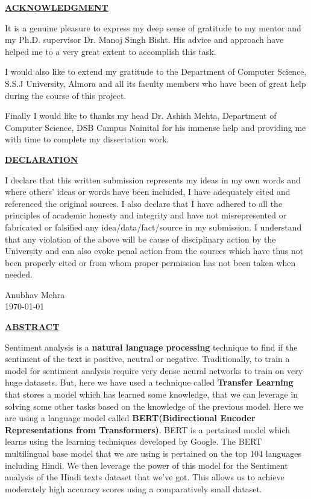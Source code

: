 \documentclass[a4paper, 12pt]{article}
\begin{document}
\begin{sloppypar}
\begin{center}
\textbf{\underline{ACKNOWLEDGMENT}}
\end{center}
It is a genuine pleasure to express my deep sense of gratitude to my mentor and my Ph.D. supervisor Dr. Manoj Singh Bisht. His advice and approach have helped me to a very great extent to accomplish this task. 

I would also like to extend my gratitude to the Department of Computer Science, S.S.J University, Almora and all its faculty members who have been of great help during the course of this project.

Finally I would like to thanks my head Dr. Ashish Mehta, Department of Computer Science, DSB Campus Nainital for his immense help and providing me with time to complete my dissertation work.
\thispagestyle{empty}
\clearpage
\begin{center}
\textbf{\underline{DECLARATION}}
\end{center}
I declare that this written submission represents my ideas in my own words and where others' ideas or words have been included, I have adequately cited and referenced the original sources. I also declare that I have adhered to all the principles of academic honesty and integrity and have not  misrepresented or fabricated or falsified any idea/data/fact/source in my submission. I understand that any violation of the above will be cause of disciplinary action by the University and can also evoke penal action from the sources which have thus not been properly cited or from whom proper permission has not been taken when needed.
\begin{flushright}
Anubhav Mehra \\
\today
\end{flushright}
\thispagestyle{empty}
\clearpage
\begin{center}
\textbf{\underline{ABSTRACT}} \\ [0.5ex]
\end{center}
 Sentiment analysis is a \textbf{natural language processing} technique to find if the sentiment of the text is positive, neutral or negative. Traditionally, to train a model for sentiment analysis require very dense neural networks to train on very huge datasets. But, here we have used a technique called \textbf{Transfer Learning} that stores a model which has learned some knowledge, that we can leverage in solving some other tasks based on the knowledge of the previous model. Here we are using a language model called  \textbf{BERT(Bidirectional Encoder Representations from Transformers)}. BERT is a pertained model which learns using the learning techniques developed by Google. The BERT multilingual base model that we are using is pertained on the top 104 languages including Hindi. We then leverage the power of this model for the Sentiment analysis of the Hindi texts dataset that we've got. This allows us to achieve moderately high accuracy scores using a comparatively small dataset.


\end{sloppypar}
\end{document}
